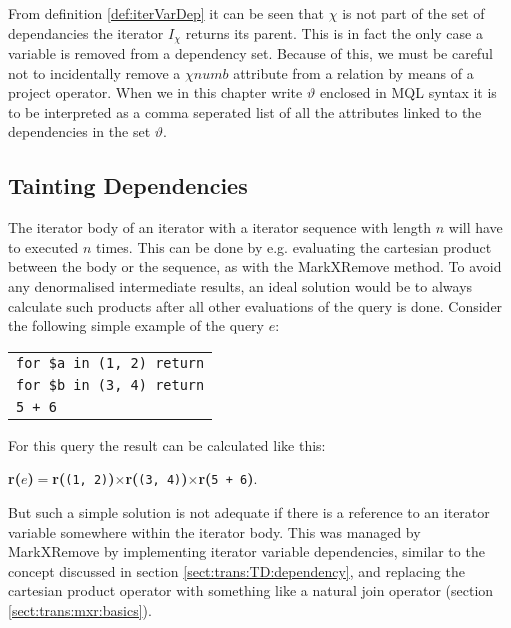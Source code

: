 From definition \ref{def:iterVarDep} it can be seen that $\chi$ is not part of the set of dependancies the iterator
$I_{\chi}$ returns its parent. This is in fact the only case a variable is removed from a dependency set.
Because of this, we must be careful not to incidentally remove a $\chi$$numb$ attribute from a relation by means
of a \textsf{project} operator. When we in this chapter write $\vartheta$ enclosed in MQL syntax it is to be
interpreted as a comma seperated list of all the attributes linked to the dependencies in the set $\vartheta$.

\subsection{Tainting Dependencies}
\label{sect:trans:TD:tainting}

The iterator body of an iterator with a iterator sequence with length $n$ will have to executed $n$ times. This
can be done by e.g. evaluating the cartesian product between the body or the sequence, as with the MarkXRemove
method. To avoid any denormalised intermediate results, an ideal solution would be to always calculate such
products after all other evaluations of the query is done. Consider the following simple example of the query $e$:

\begin{center}
\begin{tabular}{l}
\texttt{for \$a in (1, 2) return} \\ \qquad
\texttt{for \$b in (3, 4) return} \\ \qquad \qquad
\texttt{5 + 6}
\end{tabular}
\end{center}

For this query the result can be calculated like this:
\noindent
\begin{center}
\textbf{r(}$e$\textbf{)}$=$\textbf{r(}\texttt{(1, 2)}\textbf{)}$\times$\textbf{r(}\texttt{(3,
4)}\textbf{)}$\times$\textbf{r(}\texttt{5 + 6}\textbf{)}.
\end{center}
\noindent

But such a simple solution is not adequate if there is a reference to an iterator variable somewhere within the
iterator body. This was managed by MarkXRemove by implementing iterator variable dependencies, similar to the
concept discussed in section \ref{sect:trans:TD:dependency}, and replacing the cartesian product operator with
something like a natural join operator (section \ref{sect:trans:mxr:basics}).


